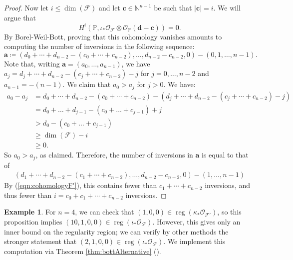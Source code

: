 \documentclass[12pt,reqno]{amsart}
\theoremstyle{definition}
\newtheorem{example}[theorem]{Example}
\theoremstyle{remark}
\newcommand{\reg}{\operatorname{reg}}
\newcommand{\calF}{{\mathcal{F}}}
\newcommand{\calO}{{\mathcal{O}}}
\begin{document}
\begin{proof}
    Now let $i \leq \dim(\calF)$ and let $\mathbf{c} \in \mathbb N^{n-1}$ be such that $|\mathbf{c}| = i$.  We will argue that
\begin{equation*}\label{eqn:cohomologyF}
        H^i(\mathbb P,\iota_*\calO_{\calF}\otimes \calO_{\mathbb P}(\mathbf d - \mathbf c)) = 0.
    \end{equation*}  
    By Borel-Weil-Bott, proving that this cohomology vanishes amounts to computing the number of inversions in the following sequence:
    \begin{equation*}\label{longerTuple}
        \mathbf{a} \coloneqq (d_0+\cdots+d_{n-2}-(c_0+\cdots+c_{n-2}),\ldots,d_{n-2}-c_{n-2},0) - (0,1,\ldots,n-1).
    \end{equation*}
    Note that, writing $\mathbf{a} = (a_0,\ldots,a_{n-1})$, we have $a_j = d_j+\cdots+d_{n-2}-(c_j+\cdots+c_{n-2})-j$ for $j = 0, \ldots, n-2$ and $a_{n-1} = -(n-1)$. We claim that $a_0 > a_j$ for $j>0$.  We have:
    \begin{align*}
        a_0 - a_j &= d_0+\cdots+d_{n-2}-(c_0+\cdots+c_{n-2}) - (d_j+\cdots+d_{n-2}-(c_j+\cdots+c_{n-2})-j)\\
        &= d_0 + \ldots + d_{j-1} - (c_0 + \ldots + c_{j-1}) + j\\
        &> d_0 - (c_0 + \ldots + c_{j-1})\\
        &\geq \dim(\calF) -i\\
        &\geq 0.
    \end{align*}
    So $a_0 > a_j$, as claimed.  Therefore, the number of inversions in $\mathbf{a}$ is equal to that of
    \begin{align*}
        (d_1+\cdots+d_{n-2}-(c_1+\cdots+c_{n-2}),\ldots,d_{n-2}-c_{n-2},0) - (1,\ldots,n-1)
    \end{align*}
    By (\ref{eqn:cohomologyF'}), this contains fewer than $c_1+\cdots+c_{n-2}$ inversions, and thus fewer than $i = c_0+c_1+\cdots+c_{n-2}$ inversions.
\end{proof}

\begin{example}
    For $n = 4$, we can check that $(1,0,0) \in \reg(\kappa_*\calO_{\calF'})$, so this proposition implies $(10,1,0,0) \in \reg(\iota_*\calO_{\calF})$.  However, this gives only an inner bound on the regularity region; we can verify by other methods the stronger statement that $(2,1,0,0) \in \reg(\iota_*\calO_{\calF})$.  We implement this computation via Theorem \ref{thm:bottAlternative} (\cite{githubRepo}).
\end{example}
\end{document}
